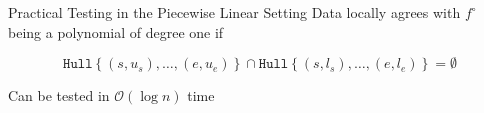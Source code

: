 \documentclass{beamer}
\begin{document}
\begin{frame}{Practical Testing in the Piecewise Linear Setting}
Data locally agrees with $f^\circ$ being a polynomial of degree one if

\begin{exampleblock}{}
\begin{equation*}
	\texttt{Hull} \left \{ (s, u_s), \dots, (e, u_e) \right \} \cap \texttt{Hull}  \left \{ (s, l_s), \dots, (e, l_e) \right \} = \emptyset
\end{equation*}
\end{exampleblock}

Can be tested in $\mathcal{O} \left ( \log n \right )$ time \citep{chazelle1987intersection}




\end{frame}
\end{document}
